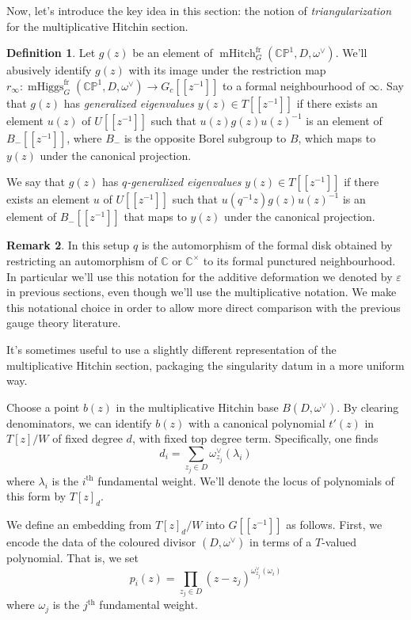 \documentclass[11pt, oneside, reqno]{amsart}
\theoremstyle{definition} \newtheorem{definition}{Definition}[section]
\theoremstyle{definition} \newtheorem{remark}[definition]{Remark}
\theoremstyle{definition} \newtheorem{remarks}[definition]{Remarks}
\theoremstyle{definition} \newtheorem{question}[definition]{Question}
\theoremstyle{definition} \newtheorem*{note}{Note}
\theoremstyle{definition} \newtheorem{example}[definition]{Example}
\theoremstyle{definition} \newtheorem{examples}[definition]{Examples}
\newcommand{\bb}[1]{\mathbb{#1}}
\newcommand{\CC}{\mathbb{C}}
\newcommand{\eps}{\varepsilon}
\DeclareMathOperator{\mhiggs}{mHiggs}
\DeclareMathOperator{\mhitch}{mHitch}
\newcommand{\fr}{\mathrm{fr}}
\begin{document}
Now, let's introduce the key idea in this section: the notion of \emph{triangularization} for the multiplicative Hitchin section.
\begin{definition} \label{gen_evals_def}
Let $g(z)$ be an element of $\mhitch^\fr_G(\bb{CP}^1, D, \omega^\vee)$.  We'll abusively identify $g(z)$ with its image under the restriction map $r_\infty \colon \mhiggs_G^\fr(\bb{CP}^1,D,\omega^\vee) \to G_c[[z^{-1}]]$ to a formal neighbourhood of $\infty$.  Say that $g(z)$ has \emph{generalized eigenvalues} $y(z) \in T[[z^{-1}]]$ if there exists an element $u(z)$ of $U[[z^{-1}]]$ such that $u(z)g(z)u(z)^{-1}$ is an element of $B_-[[z^{-1}]]$, where $B_-$ is the opposite Borel subgroup to $B$, which maps to $y(z)$ under the canonical projection.

We say that $g(z)$ has \emph{$q$-generalized eigenvalues} $y(z) \in T[[z^{-1}]]$ if there exists an element $u$ of $U[[z^{-1}]]$ such that $u(q^{-1}z)g(z)u(z)^{-1}$ is an element of $B_-[[z^{-1}]]$ that maps to $y(z)$ under the canonical projection. 
\end{definition}

\begin{remark}
In this setup $q$ is the automorphism of the formal disk obtained by restricting an automorphism of $\CC$ or $\CC^\times$ to its formal punctured neighbourhood.  In particular we'll use this notation for the additive deformation we denoted by $\eps$ in previous sections, even though we'll use the multiplicative notation.  We make this notational choice in order to allow more direct comparison with the previous gauge theory literature.
\end{remark}

It's sometimes useful to use a slightly different representation of the multiplicative Hitchin section, packaging the singularity datum in a more uniform way. 

Choose a point $b(z)$ in the multiplicative Hitchin base $B(D,\omega^\vee)$. By clearing denominators, we can identify $b(z)$ with a canonical polynomial $t'(z)$ in $T[z]/W$ of fixed degree $d$, with fixed top degree term.  Specifically, one finds
\[d_i = \sum_{z_j \in D} \omega^\vee_{z_j}(\lambda_i)\]
where $\lambda_i$ is the $i^\text{th}$ fundamental weight.  We'll denote the locus of polynomials of this form by $T[z]_d$.

We define an embedding from $T[z]_d/W$ into $G[[z^{-1}]]$ as follows.  First, we encode the data of the coloured divisor $(D, \omega^\vee)$ in terms of a $T$-valued polynomial.  That is, we set 
\[p_i(z) = \prod_{z_j \in D} (z-z_j)^{\omega^\vee_{z_j}(\omega_i)}\]
where $\omega_j$ is the $j^{\text{th}}$ fundamental weight.
\end{document}
